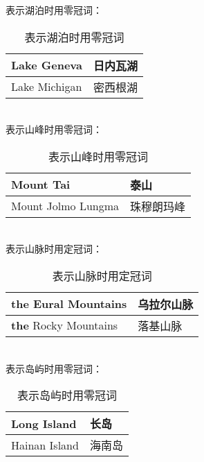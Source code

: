 \documentclass[UTF8]{ctexart}
\begin{document}
    表示湖泊时用零冠词：
    \begin{table}[h!]
        \begin{center}
            \ttfamily
            \begin{tabular}{p{180pt}|p{100pt}}
                \hline
                Lake Geneva&日内瓦湖\\ \hline
                Lake Michigan&密西根湖\\ \hline
            \end{tabular}
            \rmfamily
            \caption{表示湖泊时用零冠词}
        \end{center}
    \end{table}\\
    表示山峰时用零冠词：
    \begin{table}[h!]
        \begin{center}
            \ttfamily
            \begin{tabular}{p{180pt}|p{100pt}}
                \hline
                Mount Tai&泰山\\ \hline
                Mount Jolmo Lungma&珠穆朗玛峰\\ \hline
            \end{tabular}
            \rmfamily
            \caption{表示山峰时用零冠词}
        \end{center}
    \end{table}\\
    表示山脉时用定冠词：
    \begin{table}[h!]
        \begin{center}
            \ttfamily
            \begin{tabular}{p{180pt}|p{100pt}}
                \hline
                \textbf{the} Eural Mountains&乌拉尔山脉\\ \hline
                \textbf{the} Rocky Mountains&落基山脉\\ \hline
            \end{tabular}
            \rmfamily
            \caption{表示山脉时用定冠词}
        \end{center}
    \end{table}\\
    表示岛屿时用零冠词：
    \begin{table}[h!]
        \begin{center}
            \ttfamily
            \begin{tabular}{p{180pt}|p{100pt}}
                \hline
                Long Island&长岛\\ \hline
                Hainan Island&海南岛\\ \hline
            \end{tabular}
            \rmfamily
            \caption{表示岛屿时用零冠词}
        \end{center}
    \end{table}\\
\end{document}
